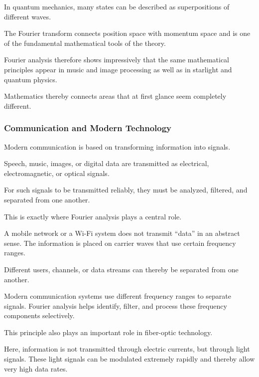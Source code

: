 \begin{DidacticBox}
	\small
	\label{box:fourier-quantenmechanik}
	In quantum mechanics, many states can be described
	as superpositions of different waves.
	
	The Fourier transform connects
	position space with momentum space
	and is one of the fundamental mathematical tools of the theory.
\end{DidacticBox}

Fourier analysis therefore shows impressively
that the same mathematical principles appear
in music and image processing
as well as in starlight and quantum physics.

Mathematics thereby connects areas
that at first glance seem completely different.

\subsubsection*{Communication and Modern Technology}

Modern communication is based on transforming information into signals.

Speech,
music,
images,
or digital data
are transmitted as electrical,
electromagnetic,
or optical signals.

For such signals to be transmitted reliably,
they must be analyzed,
filtered,
and separated from one another.

This is exactly where Fourier analysis plays a central role.

\medskip

A mobile network or a Wi-Fi system does not transmit ``data'' in an abstract sense.
The information is placed on carrier waves
that use certain frequency ranges.

Different users,
channels,
or data streams
can thereby be separated from one another.

Modern communication systems use different frequency ranges
to separate signals.
Fourier analysis helps identify,
filter,
and process these frequency components selectively.

This principle also plays an important role in fiber-optic technology.

Here, information is not transmitted through electric currents,
but through light signals.
These light signals can be modulated extremely rapidly
and thereby allow very high data rates.

